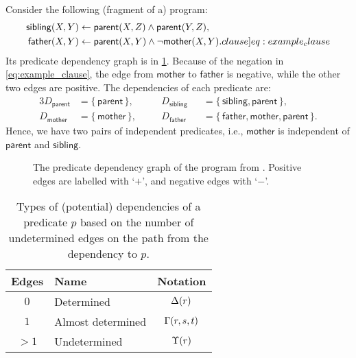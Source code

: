 \begin{example}\label{ex:program}
  Consider the following (fragment of a) program:
  \begin{align}
    \mathsf{sibling}(X, Y) &\gets \mathsf{parent}(X, Z) \land \mathsf{parent}(Y, Z), \nonumber \\
    \mathsf{father}(X, Y) &\gets \mathsf{parent}(X, Y) \land \neg\mathsf{mother}(X, Y). \label[clause]{eq:example_clause}
  \end{align}
  Its predicate dependency graph is in \cref{fig:predicate_dependencies}.
  Because of the negation in \cref{eq:example_clause}, the edge from
  $\mathsf{mother}$ to $\mathsf{father}$ is negative, while the other two edges
  are positive. The dependencies of each predicate are:
  \begin{alignat*}{3}
    D_{\mathsf{parent}} &= \{\, \mathsf{parent} \,\}, \quad && D_{\mathsf{sibling}} &&= \{\, \mathsf{sibling}, \mathsf{parent} \,\},\\
    D_{\mathsf{mother}} &= \{\, \mathsf{mother} \,\}, \quad && D_{\mathsf{father}} &&= \{\, \mathsf{father}, \mathsf{mother}, \mathsf{parent} \,\}.
  \end{alignat*}
  Hence, we have two pairs of independent predicates, i.e., $\mathsf{mother}$ is
  independent of $\mathsf{parent}$ and $\mathsf{sibling}$.
\end{example}

\begin{figure}[t]
  \centering
  \caption{The predicate dependency graph of the program from
    . Positive edges are labelled with `$+$', and
    negative edges with `$-$'.}\label{fig:predicate_dependencies}
\end{figure}

\begin{table}[t]
  \centering
  \begin{tabular}{clc}
    \toprule
    Edges & Name & Notation \\
    \midrule
    $0$ & Determined & $\operatorname{\Delta}(r)$ \\
    $1$ & Almost determined & $\operatorname{\Gamma}(r, s, t)$ \\
    $>1$ & Undetermined & $\operatorname{\Upsilon}(r)$ \\
    \bottomrule
  \end{tabular}
  \caption{Types of (potential) dependencies of a predicate $p$ based on the
    number of undetermined edges on the path from the dependency to
    $p$.}\label{tbl:dependencies}
\end{table}

